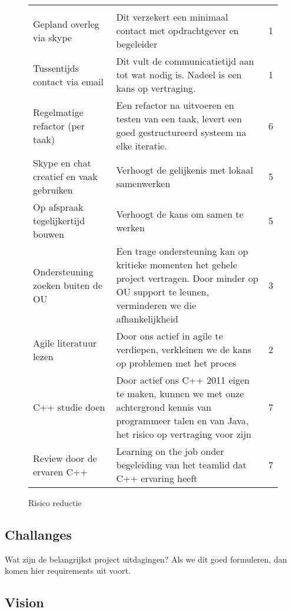 \begin{figure}[!ht]
\begin{center}
\small
\begin{tabular}{p{10em}p{20em}c}
    {\bf } & {\bf } & {\bf } \\
    Gepland overleg via skype & Dit verzekert een minimaal contact met opdrachtgever en begeleider & 1\\
    Tussentijds contact via email & Dit vult de communicatietijd aan tot wat nodig is. Nadeel is
				    een kans op vertraging. & 1\\
    Regelmatige refactor (per taak) & Een refactor na uitvoeren en testen van een taak, levert
					een goed gestructureerd systeem na elke iteratie. & 6\\
    Skype en chat creatief en vaak gebruiken & Verhoogt de gelijkenis met lokaal samenwerken & 5\\
    Op afspraak tegelijkertijd bouwen & Verhoogt de kans om samen te werken & 5\\
    Ondersteuning zoeken buiten de OU & Een trage ondersteuning kan op kritieke momenten
					het gehele project vertragen. Door minder op
					OU support te leunen, verminderen we die afhankelijkheid & 3\\
    Agile literatuur lezen & Door ons actief in agile te verdiepen, verkleinen we de kans op
				problemen met het proces & 2\\
    C++ studie doen & Door actief ons C++ 2011 eigen te maken, kunnen we
			met onze achtergrond kennis van programmeer talen en
			van Java, het risico op vertraging voor zijn & 7\\
    Review door de ervaren C++ & Learning on the job onder begeleiding van
				het teamlid dat C++ ervaring heeft & 7\\
\end{tabular}
\end{center}
 \caption{Risico reductie}\label{fig: risico reductie}
\end{figure}


\subsection{Challanges}

Wat zijn de belangrijkst project uitdagingen? Als we dit goed formuleren, dan komen hier
requirements uit voort.

\subsection{Vision}

